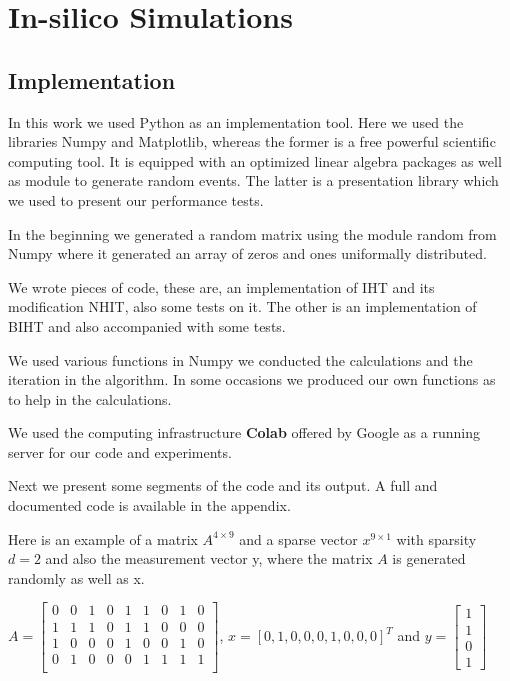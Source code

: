 \chapter{In-silico Simulations}

\section{Implementation} 

In this work we used Python as an implementation tool. Here we used the libraries Numpy and Matplotlib, whereas the former is a free powerful scientific computing tool. It is equipped with an optimized linear algebra packages as well as module to generate random events. The latter is a presentation library which we used to present our performance tests. 

In the beginning we generated a random matrix using the module random from Numpy where it generated an array of zeros and ones uniformally distributed. 

We wrote pieces of code, these are, an implementation of IHT and its modification NHIT, also some tests on it. The other is an implementation of BIHT and also accompanied with some tests. 


We used various functions in Numpy we conducted the calculations and the iteration in the algorithm. In some occasions we produced our own functions as to help in the calculations.   


We used the computing infrastructure \textbf{Colab} offered by Google as a running server for our code and experiments. 

Next we present some segments of the code and its output. A full and documented code is available in the appendix.   

Here is an example of a matrix $A^{4\times 9}$ and a sparse vector $x^{9\times1}$ with sparsity $d = 2$ and also the measurement vector y, where the matrix $ A $ is generated randomly as well as x.  




$ A =  \begin{bmatrix}
0 & 0 & 1 & 0 & 1 & 1 & 0 & 1 &0 \\
1 & 1 & 1 & 0 & 1 & 1 & 0 & 0 &0 \\
1 & 0 & 0 & 0 & 1 & 0 & 0 & 1 &0 \\
0 & 1 & 0 & 0 & 0 & 1 & 1 & 1 &1 \\
\end{bmatrix}$,  \quad  $ x = [0, 1, 0, 0, 0, 1, 0, 0, 0]^{T} $  and $y = \begin{bmatrix}
1\\
1\\
0\\
1
\end{bmatrix}$

